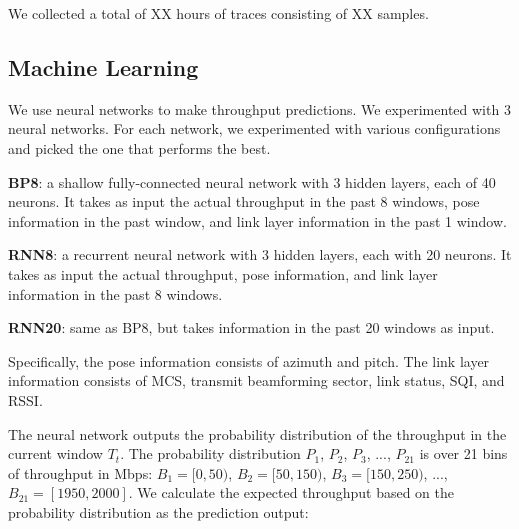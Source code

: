 \documentclass[sigconf,anonymous]{acmart}
\begin{document}
We collected a total of XX hours of traces consisting of XX samples.

\subsection{Machine Learning}
\label{subsection: Machine Learning}

We use neural networks to make throughput predictions. We experimented with 3 neural networks. For each network, we experimented with various configurations and picked the one that performs the best.

\textbf{BP8}: a shallow fully-connected neural network with 3 hidden layers, each of 40 neurons. It takes as input the actual throughput in the past 8 windows, pose information in the past window, and link layer information in the past 1 window.

\textbf{RNN8}: a recurrent neural network with 3 hidden layers, each with 20 neurons. It takes as input the actual throughput, pose information, and link layer information in the past 8 windows.

\textbf{RNN20}: same as BP8, but takes information in the past 20 windows as input.

Specifically, the pose information consists of azimuth and pitch. The link layer information consists of MCS, transmit beamforming sector, link status, SQI, and RSSI.


The neural network outputs the probability distribution of the throughput in the current window $T_{t}$. The probability distribution $P_{1}$, $P_{2}$, $P_{3}$, ..., $P_{21}$ is over 21 bins of throughput in Mbps: $B_{1}=[0,50)$, $B_{2}=[50, 150)$, $B_{3}=[150, 250)$, ..., $B_{21}=[1950, 2000]$. We calculate the expected throughput based on the probability distribution as the prediction output:
\end{document}
